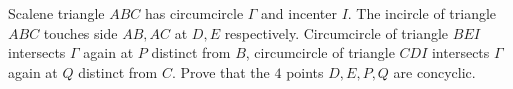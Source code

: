 Scalene triangle $ABC$ has circumcircle $\Gamma$ and incenter $I$. The incircle of triangle $ABC$ touches side $AB,AC$ at $D,E$ respectively. Circumcircle of triangle $BEI$ intersects $\Gamma$ again at $P$ distinct from $B$, circumcircle of triangle $CDI$ intersects $\Gamma$ again at $Q$ distinct from $C$. Prove that the $4$ points $D,E,P,Q$ are concyclic.